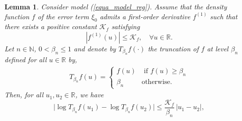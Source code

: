 \documentclass[10pt,a4paper]{amsart}
\newtheorem{lem}{Lemma}
\newcommand{\N}{\ensuremath{\mathbb{N}}}
\newcommand{\R}{\ensuremath{\mathbb{R}}}
\begin{document}
\begin{lem}\label{Lemma1}
  Consider model (\ref{equa_model_reg}). Assume that the density function $f$ of the error term $\xi_0$ admits a first-order derivative $f^{(1)}$ such that there exists a positive constant $\mathcal{K}_f$ satisfying 
  \[
    |f^{(1)}(u)| \leq \mathcal{K}_f, \quad \forall u \in \R.
  \]
 Let $n \in \N$, $0 < \beta_n \leq 1$ and denote by $T_{\beta_n} f(\cdot)$ the truncation of $f$ at level $\beta_n$ defined for all $u \in \R$ by,
 \begin{align}\label{equa_truncation_func_f}
T_{\beta_n}f(u) = \left\{
\begin{array}{ll}
  f(u)   & \text{ if } f(u) \ge \beta_n  \\
  \beta_n   &  \text{otherwise}.
\end{array}
\right.
\end{align}
  Then, for all $u_1, u_2 \in \R$, we have
  \begin{equation}\label{Proof_log_Tbeta_Lipschitz}
    \big|\log T_{\beta_n} f(u_1) - \log T_{\beta_n} f(u_2)\big|
    \leq \frac{\mathcal{K}_f}{\beta_n}\, |u_1 - u_2|,
  \end{equation}
\end{lem}
\end{document}
